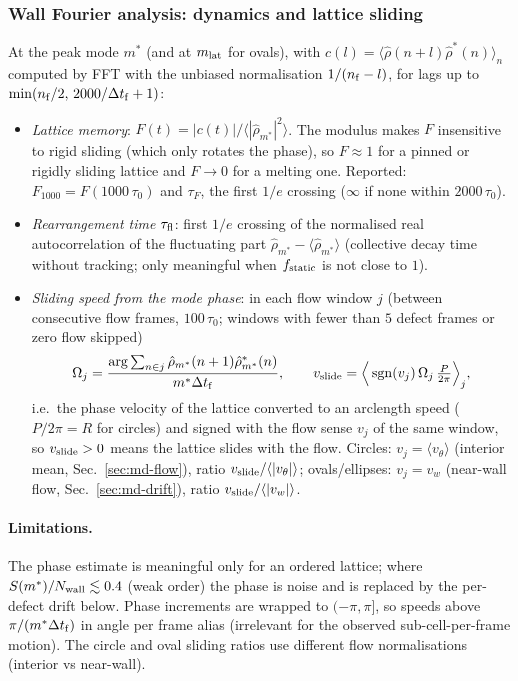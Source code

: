 \subsubsection{Wall Fourier analysis: dynamics and lattice sliding}
\label{sec:md-fourier-dyn}

At the peak mode $m^*$ (and at $m_{\rm lat}$ for ovals), with $c(l)=\langle\hat\rho(n+l)\hat\rho^*(n)\rangle_n$ computed by FFT with the
unbiased normalisation $1/(n_{\rm f}-l)$, for lags up to $\min(n_{\rm f}/2,\,2000/\Delta t_{\rm f}+1)$:
\begin{itemize}
\item \emph{Lattice memory}: $F(t)=|c(t)|/\langle|\hat\rho_{m^*}|^2\rangle$. The modulus makes $F$ insensitive to rigid sliding (which only
  rotates the phase), so $F\approx1$ for a pinned or rigidly sliding lattice and $F\to0$ for a melting one. Reported: $F_{1000}=F(1000\,\tau_0)$
  and $\tau_F$, the first $1/e$ crossing ($\infty$ if none within $2000\,\tau_0$).
\item \emph{Rearrangement time} $\tau_{\rm fl}$: first $1/e$ crossing of the normalised real autocorrelation of the fluctuating part
  $\hat\rho_{m^*}-\langle\hat\rho_{m^*}\rangle$ (collective decay time without tracking; only meaningful when $f_{\rm static}$ is not close to $1$).
\item \emph{Sliding speed from the mode phase}: in each flow window $j$ (between consecutive flow frames, $100\,\tau_0$; windows with fewer than
  $5$ defect frames or zero flow skipped)
  \begin{equation}
    \Omega_j=\frac{\arg\sum_{n\in j}\hat\rho_{m^*}(n+1)\hat\rho^*_{m^*}(n)}{m^*\Delta t_{\rm f}},\qquad
    v_{\rm slide}=\Big\langle\operatorname{sgn}(v_j)\,\Omega_j\,\tfrac{P}{2\pi}\Big\rangle_j ,
  \end{equation}
  i.e.\ the phase velocity of the lattice converted to an arclength speed ($P/2\pi=R$ for circles) and signed with the flow sense $v_j$ of the
  same window, so $v_{\rm slide}>0$ means the lattice slides with the flow. Circles: $v_j=\langle v_\theta\rangle$ (interior mean,
  Sec.~\ref{sec:md-flow}), ratio $v_{\rm slide}/\langle|v_\theta|\rangle$; ovals/ellipses: $v_j=v_w$ (near-wall flow, Sec.~\ref{sec:md-drift}),
  ratio $v_{\rm slide}/\langle|v_w|\rangle$.
\end{itemize}
\paragraph{Limitations.} The phase estimate is meaningful only for an ordered lattice; where $S(m^*)/N_{\rm wall}\lesssim0.4$ (weak order) the
phase is noise and is replaced by the per-defect drift below. Phase increments are wrapped to $(-\pi,\pi]$, so speeds above
$\pi/(m^*\Delta t_{\rm f})$ in angle per frame alias (irrelevant for the observed sub-cell-per-frame motion).
The circle and oval sliding ratios use different flow normalisations (interior vs near-wall).

